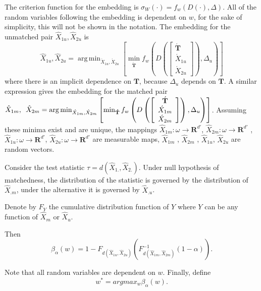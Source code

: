 \documentclass[11pt]{article} %
\DeclareMathOperator*{\argmin}{arg\,min}
\begin{document}
 The criterion function for the embedding is $\sigma_W(\cdot) =f_w(D({\cdot}),\Delta)$. All of the random variables following the embedding is dependent on $w$, for the sake of simplicity, this  will not be shown in the notation. The embedding for the unmatched pair ${\hat{X}_{1u},\hat{X}_{2u}}$  is 
 \[
{\hat{X}_{1u},\hat{X}_{2u}}
=\argmin_{\acute{X}_{1u}, \acute{X}_{2u}}\left[\min_{\mathbf{\acute{T}}}
{f_w\left(
D\left(
\left[
\begin{array}{c}
\acute{\mathbf{T}} \\
\acute{X}_{1u} \\
\acute{X}_{2u}
\end {array}
\right]
\right),
\Delta_{u}
\right)
}
\right]
\]
where there is an implicit dependence on $\mathbf{T}$, because $\Delta_{u}$ depends on $\mathbf{T}$. 
A similar expression gives the embedding for the matched pair  
${\hat{X}_{1m},\hspace{0.5em}\hat{X}_{2m}}=\argmin_{\acute{X}_{1m}, \acute{X}_{2m}}\left[\min_{\mathbf{\acute{T}}}
{f_w\left(
D\left(
\left[
\begin{array}{c}
\acute{\mathbf{T}} \\
\acute{X}_{1m} \\
\acute{X}_{2m}
\end {array}
\right]
\right),
\Delta_{u}
\right)
}
\right]$.
 Assuming these minima exist and are unique, the mappings $\hat{X}_{1m}:\omega\rightarrow \mathbf{R}^{d'}$,  $\hat{X}_{2m}:\omega\rightarrow \mathbf{R}^{d'}$ , $\hat{X}_{1u}:\omega\rightarrow \mathbf{R}^{d'}$, 
$\hat{X}_{2u}:\omega\rightarrow \mathbf{R}^{d'}$ are  measurable maps,  $\hat{X}_{1m}$ , $\hat{X}_{2m}$ , $\hat{X}_{1u}$, $\hat{X}_{2u}$ are random vectors. 

Consider the test statistic $\tau=d(\hat{X}_{1.},\hat{X}_{2.})$. Under null hypothesis of matchedness, the distribution of the statistic is governed by the distribution of $\hat{X}_{.m}$, under the alternative it is governed by  $\hat{X}_{.u}$.

Denote by $F_Y$ the   cumulative distribution function of  $Y$ where $Y$ can be  any function of $\hat{X}_m$ or $\hat{X}_u$. 



 Then $$\beta_{\alpha}\left( w\right)=1-F_{d(\hat{X}_{1u},\hat{X}_{2u})}(F_{d(\hat{X}_{1m},\hat{X}_{2m})}^{-1}(1-\alpha)).$$

 Note that all random variables are dependent on $w$. Finally, define $$w^{*}=argmax_w{\beta_{\alpha}\left( w\right)}. $$
\end{document}
